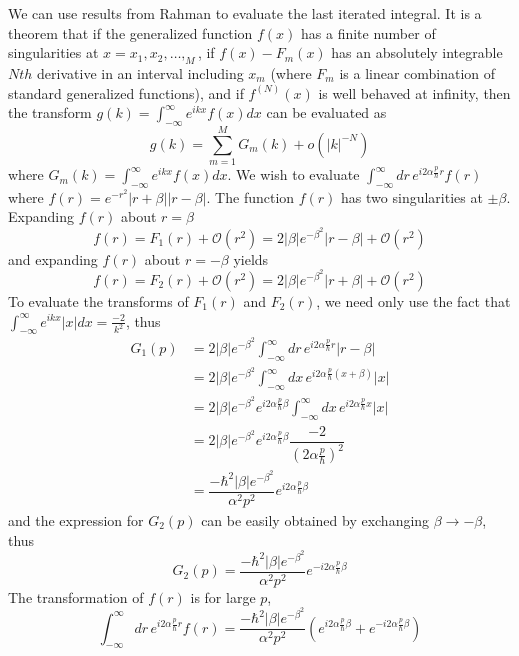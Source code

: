 \documentclass[onecolumn,english,aps,pra]{revtex4}
\begin{document}
We can use results from Rahman \footnotemark
{} to evaluate the last iterated integral. It is a theorem that if the generalized function $f(x)$ has a finite number of singularities at $x = x_{1}, x_{2}, \ldots, _{M}$, if $f(x) - F_{m}(x)$ has an absolutely integrable $Nth$ derivative in an interval including $x_{m}$ (where $F_{m}$ is a linear combination of standard generalized functions), and if $f^{(N)}(x)$ is well behaved at infinity, then the transform $g(k) = \int_{-\infty}^{\infty} e^{ikx} f(x) dx$ can be evaluated as 
%
\[ g(k) = \sum_{m = 1}^{M} G_{m}(k) + o(|k|^{-N}) \]
%
where $G_{m}(k) = \int_{-\infty}^{\infty} e^{ikx} f(x) dx$.
%
%
We wish to evaluate $\int_{-\infty}^{\infty} dr \, e^{i 2\alpha \frac{p}{\hbar} r} f(r) $ where $f(r) = e^{-r^2} |r + \beta| |r - \beta|$. The function $f(r)$ has two singularities at $\pm \beta $. Expanding $f(r)$ about $r = \beta$
%
\[ f(r) = F_{1}(r) + \mathcal{O}(r^2) = 2 |\beta| e^{-\beta^2} |r - \beta| + \mathcal{O}(r^2)\]
%
and expanding $f(r)$ about $r = -\beta$ yields
%
\[ f(r) = F_{2}(r) + \mathcal{O}(r^2)  = 2 |\beta| e^{-\beta^2} |r + \beta| + \mathcal{O}(r^2) \]
%
To evaluate the transforms of $F_{1}(r)$ and $F_{2}(r)$, we need only use the fact that $\int_{-\infty}^{\infty} e^{ikx} |x| dx = \frac{-2}{k^2}$, thus
%
\begin{align*}
G_{1}(p) & = 2 |\beta| e^{-\beta^2} \int_{-\infty}^{\infty} dr \, e^{i 2\alpha \frac{p}{\hbar} r}|r - \beta|\\
& =  2 |\beta| e^{-\beta^2} \int_{-\infty}^{\infty} dx \, e^{i 2\alpha \frac{p}{\hbar} (x + \beta)} |x|\\
& =  2 |\beta| e^{-\beta^2} e^{i 2\alpha \frac{p}{\hbar} \beta} \int_{-\infty}^{\infty} dx \, e^{i 2\alpha \frac{p}{\hbar} x} |x|\\
& =  2 |\beta| e^{-\beta^2} e^{i 2\alpha \frac{p}{\hbar} \beta} \dfrac{-2}{(2\alpha \frac{p}{\hbar})^2}\\
& =  \dfrac{- \hbar^2 |\beta| e^{-\beta^2} }{\alpha^2 p^2} e^{i 2\alpha \frac{p}{\hbar} \beta}
\end{align*}
and the expression for $G_{2}(p)$ can be easily obtained by exchanging $\beta \rightarrow -\beta$, thus
%
\[ G_{2}(p) = \dfrac{- \hbar^2 |\beta| e^{-\beta^2} }{\alpha^2 p^2} e^{-i 2\alpha \frac{p}{\hbar} \beta} \]
%
The transformation of $f(r)$ is for large $p$,
\[ \int_{-\infty}^{\infty} dr \, e^{i 2\alpha \frac{p}{\hbar} r} f(r) = \dfrac{- \hbar^2 |\beta| e^{-\beta^2} }{\alpha^2 p^2} (e^{i 2\alpha \frac{p}{\hbar} \beta} + e^{-i 2\alpha \frac{p}{\hbar} \beta}) \]
\end{document}
